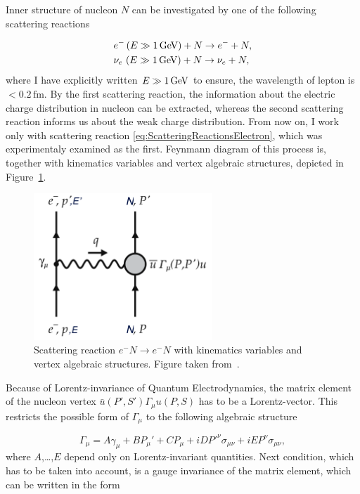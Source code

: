 Inner structure of nucleon $N$ can be investigated by one of the following
scattering reactions

\begin{align}
  &e^- \, (E \gg 1\,\text{GeV}) + N \rightarrow e^- + N,
  \label{eq:ScatteringReactionsElectron} \\
  &\nu_e \,\, (E \gg 1\,\text{GeV}) + N \rightarrow \nu_e + N,
  \label{eq:ScatteringReactionsNeutrino}
\end{align}
where I have explicitly written $E \gg 1 \,\text{GeV}$ to ensure, the wavelength
of lepton is $< 0.2\,\text{fm}$. By the first scattering reaction, the information
about the electric charge distribution in nucleon can be extracted, whereas the
second scattering reaction informs us about the weak charge distribution. 
From now on, I work only with scattering reaction
\eqref{eq:ScatteringReactionsElectron}, which was experimentaly examined as the
first. 
Feynmann diagram of this process is, together with kinematics variables and
vertex algebraic structures, depicted in Figure~\ref{fig:Scattering}. 

\begin{figure}[t]
  \centering
  \includegraphics[width=0.6\textwidth]{Chapter1/Scattering.png} 
  \caption[Scattering reaction $e^-N \rightarrow e^-N$ with kinematics variables
          and vertex algebraic structures.]
          {Scattering reaction $e^-N \rightarrow
          e^-N$ with kinematics variables and vertex algebraic structures.
          Figure taken from~\cite{QCDTextbook}.}
  \label{fig:Scattering}
\end{figure}

Because of Lorentz-invariance of Quantum Electrodynamics, the matrix
element of the nucleon vertex $\bar{u}(P',S')\Gamma_\mu u(P,S)$ has to be a
Lorentz-vector. This restricts the possible form of $\Gamma_\mu$ to the
following algebraic structure

\begin{equation}
  \Gamma_\mu = A \gamma_\mu + B P_\mu' + C P_\mu + i D P'^\nu \sigma_{\mu\nu}
    + i E P^\nu \sigma_{\mu\nu},
  \label{eq:ScatteringAlgebraicMatrix}
\end{equation}
where $A$,\dots,$E$ depend only on Lorentz-invariant quantities. Next condition,
which has to be taken into account, is a gauge invariance of the matrix element, which
can be written in the form

